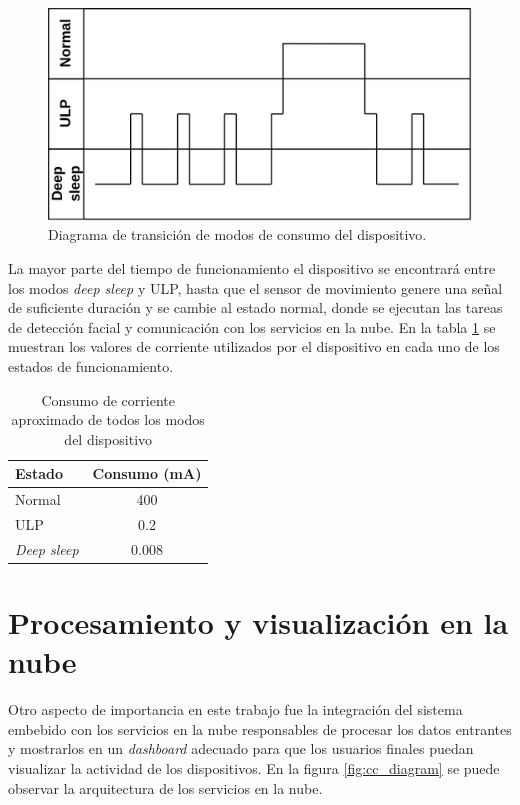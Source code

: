 \begin{figure}[h]
	\centering
	\includegraphics[scale=0.3]{./Figures/ulp_modes.png}
	\caption{Diagrama de transición de modos de consumo del dispositivo.}
	\label{fig:ulp_modes}
\end{figure}

La mayor parte del tiempo de funcionamiento el dispositivo se encontrará entre los modos \textit{deep sleep} y ULP, hasta que el sensor de movimiento genere una señal de suficiente duración y se cambie al estado normal, donde se ejecutan las tareas de detección facial y comunicación con los servicios en la nube. En la tabla \ref{tab:ulp_table} se muestran los valores de corriente utilizados por el dispositivo en cada uno de los estados de funcionamiento.

\begin{table}[h]
	\centering
	\caption[Consumo de corriente del dispositivo]{Consumo de corriente aproximado de todos los modos del dispositivo}
	\begin{tabular}{lc}   
		\toprule
		\textbf{Estado} & \textbf{Consumo (mA)}  \\
		\midrule
		Normal & 400 \\
		ULP & 0.2 \\
		\textit{Deep sleep} & 0.008 \\
		\bottomrule
		\hline
	\end{tabular}
	\label{tab:ulp_table}
\end{table}

\section{Procesamiento y visualización en la nube}
Otro aspecto de importancia en este trabajo fue la integración del sistema embebido con los servicios en la nube responsables de procesar los datos entrantes y mostrarlos en un \textit{dashboard} adecuado para que los usuarios finales puedan visualizar la actividad de los dispositivos. En la figura \ref{fig:cc_diagram} se puede observar la arquitectura de los servicios en la nube.

